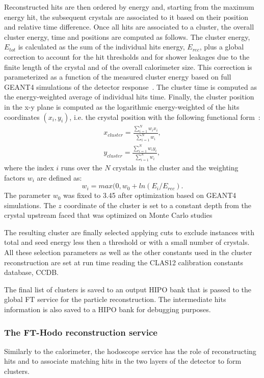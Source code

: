 Reconstructed hits are then ordered by energy and, starting from the maximum energy hit, the subsequent crystals are associated to it based on their position and relative time difference. Once all hits are associated to a cluster, the overall cluster energy, time and positions are computed as follows. The cluster energy, $E_{tot}$ is calculated as the sum of the individual hits energy, $E_{rec}$, plus a global correction to account for the hit thresholds and for shower leakages due to the finite length of the crystal and of the overall calorimeter size. This correction is parameterized as a function of the measured cluster energy based on full GEANT4 simulations of the detector response~\cite{ft-nim}. The cluster time is computed as the energy-weighted average of individual hits time. Finally, the cluster position in the x-y plane is computed as the logarithmic energy-weighted of the hits coordinates $(x_i,y_i)$, i.e. the crystal position with the following functional form~\cite{ic}:
\begin{eqnarray*}
x_{cluster} = \frac{\sum_{i=1}^N w_i x_i}{\sum_{i=1}^N w_i},\\
y_{cluster} = \frac{\sum_{i=1}^N w_i y_i}{\sum_{i=1}^N w_i},
\end{eqnarray*}
where the index $i$ runs over the $N$ crystals in the cluster and the weighting factors $w_i$ are defined as:
\begin{equation}
w_i=max(0,w_0+ln(E_i/E_{rec}).
\end{equation}
The parameter $w_0$ was fixed to 3.45 after optimization based on GEANT4 simulations. The $z$ coordinate of the cluster is set to a constant depth from the crystal upstream faced that was optimized on Monte Carlo studies

The resulting cluster are finally selected applying cuts to exclude instances with total and seed energy less then a threshold or with a small number of crystals. All these selection parameters as well as the other constants used in the cluster reconstruction are set at run time reading the CLAS12 calibration constants database, CCDB.

The final list of clusters is saved to an output HIPO bank that is passed to the global FT service for the particle reconstruction. The intermediate hits information is also saved to a HIPO bank for debugging purposes.

\subsubsection{The FT-Hodo reconstruction service}
Similarly to the calorimeter, the hodoscope service has the role of reconstructing hits and to associate matching hits in the two layers of the detector to form clusters. 


